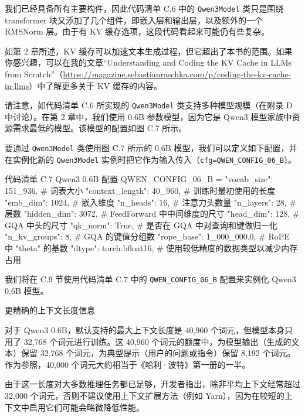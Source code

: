我们已经具备所有主要构件，因此代码清单 C.6 中的 \texttt{Qwen3Model} 类只是围绕 transformer 块又添加了几个组件，即嵌入层和输出层，以及额外的一个 RMSNorm 层。由于有 KV 缓存选项，这段代码看起来可能仍有些复杂。

如第 2 章所述，KV 缓存可以加速文本生成过程，但它超出了本书的范围。如果你感兴趣，可以在我的文章“Understanding and Coding the KV Cache in LLMs from Scratch”（\href{https://magazine.sebastianraschka.com/p/coding-the-kv-cache-in-llms}{https://magazine.sebastianraschka.com/p/coding-the-kv-cache-in-llms}）中了解更多关于 KV 缓存的内容。

请注意，如代码清单 C.6 所实现的 \texttt{Qwen3Model} 类支持多种模型规模（在附录 D 中讨论）。在第 2 章中，我们使用 0.6B 参数模型，因为它是 Qwen3 模型家族中资源需求最低的模型。该模型的配置如图 C.7 所示。


要通过 \texttt{Qwen3Model} 类使用图 C.7 所示的 0.6B 模型，我们可以定义如下配置，并在实例化新的 \texttt{Qwen3Model} 实例时把它作为输入传入（\texttt{cfg=QWEN\_CONFIG\_06\_B}）。

\begin{codeboxt}{代码清单 C.7 Qwen3 0.6B 配置}
QWEN_CONFIG_06_B = {
    "vocab_size": 151_936,     # 词表大小
    "context_length": 40_960,  # 训练时最初使用的长度
    "emb_dim": 1024,           # 嵌入维度
    "n_heads": 16,             # 注意力头数量
    "n_layers": 28,            # 层数
    "hidden_dim": 3072,        # FeedForward 中中间维度的尺寸
    "head_dim": 128,           # GQA 中头的尺寸
    "qk_norm": True,           # 是否在 GQA 中对查询和键做归一化
    "n_kv_groups": 8,          # GQA 的键值分组数
    "rope_base": 1_000_000.0,  # RoPE 中 "theta" 的基数
    "dtype": torch.bfloat16,   # 使用较低精度的数据类型以减少内存占用
}
\end{codeboxt}

我们将在 C.9 节使用代码清单 C.7 中的 \texttt{QWEN\_CONFIG\_06\_B} 配置来实例化 Qwen3 0.6B 模型。

\begin{mySidebar}{更精确的上下文长度信息}

对于 Qwen3 0.6B，默认支持的最大上下文长度是 40,960 个词元，但模型本身只用了 32,768 个词元进行训练。这 40,960 个词元的额度中，为模型输出（生成的文本）保留 32,768 个词元，为典型提示（用户的问题或指令）保留 8,192 个词元。作为参照，40,000 个词元大约相当于《哈利·波特》第一册的一半。

由于这一长度对大多数推理任务都已足够，开发者指出，除非平均上下文经常超过 32,000 个词元，否则不建议使用上下文扩展方法（例如 Yarn），因为在较短的上下文中启用它们可能会略微降低性能。

\end{mySidebar}

